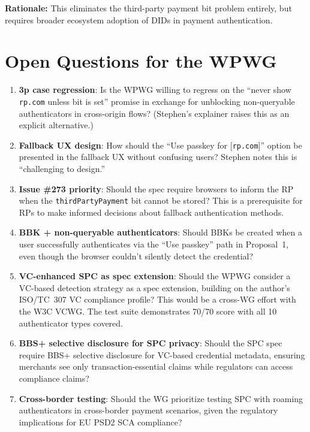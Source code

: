 \documentclass[12pt,a4paper]{article}
\begin{document}
\noindent\textbf{Rationale:} This eliminates the third-party payment bit problem entirely, but requires broader ecosystem adoption of DIDs in payment authentication.

\newpage
\section{Open Questions for the WPWG}

\begin{enumerate}[noitemsep,topsep=4pt]
  \item \textbf{3p case regression}: Is the WPWG willing to regress on the ``never show \texttt{rp.com} unless bit is set'' promise in exchange for unblocking non-queryable authenticators in cross-origin flows? (Stephen's explainer raises this as an explicit alternative.)

  \item \textbf{Fallback UX design}: How should the ``Use passkey for [\texttt{rp.com}]'' option be presented in the fallback UX without confusing users? Stephen notes this is ``challenging to design.''

  \item \textbf{Issue \#273 priority}: Should the spec require browsers to inform the RP when the \texttt{thirdPartyPayment} bit cannot be stored? This is a prerequisite for RPs to make informed decisions about fallback authentication methods.

  \item \textbf{BBK + non-queryable authenticators}: Should BBKs be created when a user successfully authenticates via the ``Use passkey'' path in Proposal~1, even though the browser couldn't silently detect the credential?

  \item \textbf{VC-enhanced SPC as spec extension}: Should the WPWG consider a VC-based detection strategy as a spec extension, building on the author's ISO/TC~307 VC compliance profile? This would be a cross-WG effort with the W3C VCWG. The test suite demonstrates 70/70 score with all 10 authenticator types covered.

  \item \textbf{BBS+ selective disclosure for SPC privacy}: Should the SPC spec require BBS+ selective disclosure for VC-based credential metadata, ensuring merchants see only transaction-essential claims while regulators can access compliance claims?

  \item \textbf{Cross-border testing}: Should the WG prioritize testing SPC with roaming authenticators in cross-border payment scenarios, given the regulatory implications for EU PSD2 SCA compliance?
\end{enumerate}
\end{document}
